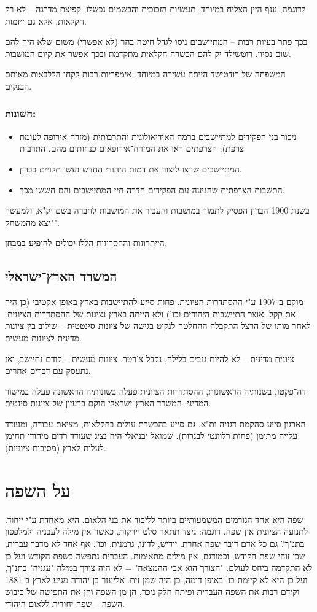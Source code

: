 \documentclass[]{article}
\begin{document}
	לדוגמה, ענף היין הצליח במיוחד. תעשיות הזכוכית והבשמים נכשלו. קפיצת מדרגה – לא רק חקלאות, אלא גם ייזמות. 
	
	בכך פתר בעיות רבות – המתיישבים ניסו לגדל חיטה בהר (לא אפשרי) משום שלא היה להם שום נסיון. רוטשילד יק להם הכשרה חקלאית מתקדמת ובכך אפשר את קיום המושבות. 
	
	המשפחה של רודטישד הייתה עשירה במיוחד, אימפריות רבות לקחו הללבאות מאותם הבנקים. 
	
	\subsubsection{חשונות: }
	\begin{itemize}
		\item ניכור בני הפקידים למתיישבים ברמה האידיאולוגית והתרבותית (מזרח אירופה לעומת צרפת). הצרפתים ראו את המזרח־אירופאים כנחותים מהם. התרבות 
		\item המתיישבים שרצו ליצור את דמות היהודי החדש נעשו תלויים בברון. 
		\item התשבות הצרפתית שהגיעה עם הפקידים חדרה חיי המתיישבים והם חששו מכך. 
	\end{itemize}
	
	בשנת 1900 הברון הפסיק לתמוך במושבות והעביר את המושבות לחברה בשם יק"א, ולמעשה "יצא מהמשחק". 
	
	הייתרונות והחסרונות הללו \textbf{יכולים להופיע במבחן}. 
	
	\subsection{המשרד הארץ־ישראלי} 
	מוקם ב־1907 ע"י ההסתדרות הציונית. 
	פחות סייע להתיישבות בארץ באופן אקטיבי (כן היה את קקל, אוצר התיישבות היהודים וכו') ולא הייתה בארץ נציגות של ההסתדרות הציונית. לאחר מותו של הרצל התקבלה ההחלטה לנקוט בגישה של \textbf{ציונות סינטטית} – שילוב בין ציונות מדינית לציונות מעשית. 
	
	ציונית מדינית – לא להיות גנבים בלילה, נקבל צ'רטר. ציונות מעשית – קודם נתיישב, ואז נתעסק עם דברים אחרים. 
	
	דה־פקטו, בשנותיה הראשונות, ההסתדרות הציונית פעלה בשונותיה הראשונה פעלה במישור המדיני. המשרד הארץ־ישראלי הוקם ברעיון של ציונות סינטית. 
	
	הארגון סייע סהקמת דגניה ות"א. גם סייע בהכשרת עולים בחקלאות, מציאת עבודה, ומעודד עלייה מתימן (פחות רלוונטי לבגרות). שמואל יבניאלי היה נציג שעודד רדים מיהודי תחימן לעלות לארץ (מסיבות ציוניות). 
	
	\section{על השפה}
	שפה היא אחד הגורמים המשמעותיים ביותר לליכוד את בני הלאום. היא מאחדת ע"י ייחוד. לתנועה הציונית אין שפה. דוגמה: גיצד תתאר סלט יירקות, כאשר אין מילה לעבניה ולמלפפון בתנ"ך? גם כל אדם דיבר שפה אחרת. יידיש, לדינו, גרמנית, וכו'. אף אחד לא מדבר עברית, שכן זוהי שפת הקודש, וכמודגם, אין מילים מתאימות. העברית נתפשה כשפת הקודש ועל כן לא התקדמה ביחס לעולם. "הצורך הוא אבי ההמצאה" = לא היה צורך במילה "עגניה" בתנ"ך, ועל כן היא לא קיימת בו. באופן דומה, כן היה שמן זית. אליעזר בן יהודה מגיע לארץ ב־1881 וקידם רבות את השפה העברית ופיתח חלק ניכר, הן מן השפה והן את התפישה של כיבוש השפה – שפה יחודית ללאום היהודי. 
	
\end{document}
